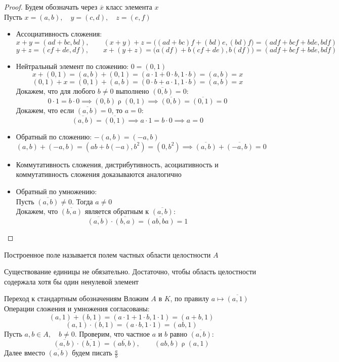 \begin{proof}
	Будем обозначать через $\overline{x}$ класс элемента $x$ \\
	Пусть $x = (a, b), \quad y = (c, d), \quad z = (e, f)$
	\begin{itemize}
		\item Ассоциативность сложения:
		$$ x + y = (ad + bc, bd), \qquad (x + y) + z = \bigg( (ad + bc)f + (bd)e, (bd)f \bigg) = (adf + bcf + bde, bdf) $$
		$$ y + z = (cf + de, df), \qquad x + (y + z) = \bigg( a(df) + b(cf + de), b(df) \bigg) = (adf + bcf + bde, bdf) $$
		\item Нейтральный элемент по сложению: $0 = (0, 1)$
		$$ x + (0, 1) = (a, b) + (0, 1) = (a \cdot 1 + 0 \cdot b, 1 \cdot b) = (a, b) = x $$
		$$ (0, 1) + x = (0, 1) + (a, b) = (0 \cdot b + a \cdot 1, 1 \cdot b) = (a, b) = x $$
		Докажем, что для любого $b \ne 0$ выполнено $ \overline{(0, b)} = 0$:
		$$ 0 \cdot 1 = b \cdot 0 \implies (0, b) \mathrel\rho (0, 1) \implies \overline{(0, b)} = \overline{(0, 1)} = 0 $$
		Докажем, что если $ \overline{(a, b)} = 0$, то $a = 0$:
		$$ \overline{(a, b)} = \overline{(0, 1)} \implies a \cdot 1 = b \cdot 0 \implies a = 0 $$
		\item Обратный по сложению: $-(a, b) = (-a, b)$
		$$ (a, b) + (-a, b) = (ab + b(-a), b^2) = (0, b^2) \implies \overline{(a, b)} + \overline{(-a, b)} = 0 $$
		\item Коммутативность сложения, дистрибутивность, асоциативность и коммутативность сложения доказываются аналогично
		\item Обратный по умножению: \\
		Пусть $\overline{(a, b)} \ne 0$. Тогда $a \ne 0 $ \\
		Докажем, что $\overline{(b, a)}$ является обратным к $\overline{(a, b)}$:
		$$ \overline{(a, b)} \cdot \overline{(b, a)} = \overline{(ab, ba)} = 1 $$
	\end{itemize}
\end{proof}

\begin{definition}
	Построенное поле называется полем частных области целостности $A$
\end{definition}

\begin{note}
	Существование единицы не обязательно. Достаточно, чтобы область целостности содержала хотя бы один ненулевой элемент
\end{note}

\begin{undefthm}{Переход к стандартным обозначениям}
	Вложим $A$ в $K$, по правилу $a \mapsto \overline{(a, 1)} $ \\
	Операции сложения и умножения согласованы:
	$$ (a, 1) + (b, 1) = (a \cdot 1 + 1 \cdot b, 1 \cdot 1) = (a + b, 1) $$
	$$ (a, 1) \cdot (b, 1) = (a \cdot b, 1 \cdot 1) = (ab, 1) $$
	Пусть $a, b \in A, \quad b \ne 0 $. Проверим, что частное $a$ и $b$ равно $\overline{(a, b)}$:
	$$ \overline{(a, b)} \cdot \overline{(b, 1)} = \overline{(ab, b)}, \qquad (ab, b) \mathrel\rho (a, 1) $$
	Далее вместо $\overline{(a, b)}$ будем писать $\frac{a}b$
\end{undefthm}

